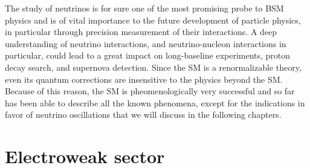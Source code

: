 The study of neutrinos is for sure one of the most promising probe to BSM physics and %
is of vital importance to the future development of particle physics, %
in particular through precision measurement of their interactions.
A deep understanding of neutrino interactions, and neutrino-nucleon interactions in particular, %
could lead to a great impact on long-baseline experiments, proton decay search, and supernova detection.
Since the SM is a renormalizable theory, even its quantum corrections are insensitive to the physics beyond the SM.
Because of this reason, the SM is pheomenologically very successful and so far has been able to describe all the known
phenomena, except for the indications in favor of neutrino oscillations that we will discuss in the following chapters.

\section{Electroweak sector}
\label{sec:inter}

